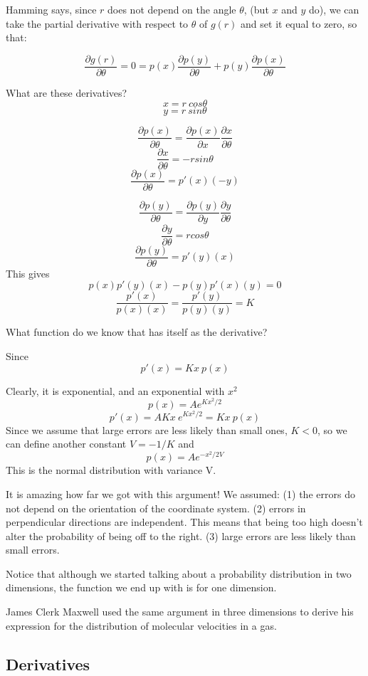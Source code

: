 \documentclass[11pt, oneside]{article}
\begin{document}
Hamming says, since $r$ does not depend on the angle $\theta$, (but $x$ and $y$ do), we can take the partial derivative with respect to $\theta$ of $g(r)$ and set it equal to zero, so that:

\[ \frac{\partial g(r)}{\partial \theta} = 0 = p(x) \frac{\partial p(y)}{\partial \theta}  + p(y) \frac{\partial p(x)}{\partial \theta} \]

What are these derivatives?
\[ x = r \ cos \theta \]
\[ y = r \ sin \theta \]

\[ \frac{\partial p(x)}{\partial \theta} = \frac{\partial p(x)}{\partial x} \frac{\partial x}{\partial \theta}\]
\[ \frac{\partial x}{\partial \theta} = - r sin \theta \]
\[ \frac{\partial p(x)}{\partial \theta} = p'(x)(-y) \]

\[ \frac{\partial p(y)}{\partial \theta} = \frac{\partial p(y)}{\partial y} \frac{\partial y}{\partial \theta}\]
\[ \frac{\partial y}{\partial \theta} = r cos \theta \]
\[ \frac{\partial p(y)}{\partial \theta} = p'(y)(x) \]
This gives
\[ p(x)p'(y)(x) - p(y)p'(x)(y) = 0 \]
\[ \frac{p'(x)}{p(x)(x)} = \frac{p'(y)}{p(y)(y)} = K \]

What function do we know that has itself as the derivative?

Since 
\[ p'(x) = Kx \ p(x) \]

Clearly, it is exponential, and an exponential with $x^2$
\[ p(x) = A e^{Kx^2/2} \]
\[ p'(x) = AKx \ e^{Kx^2/2} = Kx \ p(x) \]
Since we assume that large errors are less likely than small ones, $K < 0$, so we can define another constant $V = - 1/K$ and
\[ p(x) = A e^{-x^2/2V} \]
This is the normal distribution with variance V.

It is amazing how far we got with this argument! We assumed:
(1) the errors do not depend on the orientation of the coordinate system.
(2) errors in perpendicular directions are independent. This means that being too high doesn't alter the probability of being off to the right.
(3) large errors are less likely than small errors.

Notice that although we started talking about a probability distribution in two dimensions, the function we end up with is for one dimension.

James Clerk Maxwell used the same argument in three dimensions to derive his expression for the distribution of molecular velocities in a gas.

\subsection*{Derivatives}
\end{document}
